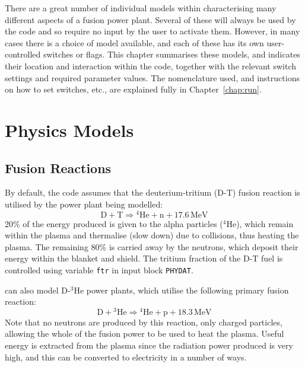 \label{chap:models}

There are a great number of individual models within \PSC characterising many
different aspects of a fusion power plant. Several of these will always be
used by the code and so require no input by the user to activate them.
However, in many cases there is a choice of model available, and each of these
has its own user-controlled switches or flags. This chapter summarises these
models, and indicates their location and interaction within the code, together
with the relevant switch settings and required parameter values. The
nomenclature used, and instructions on how to set switches, etc., are
explained fully in Chapter~\ref{chap:run}.

\section{Physics Models}

\setlength{\parskip}{0mm}
\subsection{Fusion Reactions}

By default, the code assumes that the deuterium-tritium (D-T) fusion reaction
is utilised by the power plant being modelled:
\begin{equation}
\mathrm{D + T} \Longrightarrow \mathrm{^{4}He + n + 17.6 \,MeV}
\label{eq:d-t}
\end{equation}
20\% of the energy produced is given to the alpha particles ($^4$He), which
remain within the plasma and thermalise (slow down) due to collisions, thus
heating the plasma. The remaining 80\% is carried away by the neutrons, which
deposit their energy within the blanket and shield. The tritium fraction of
the D-T fuel is controlled using variable \texttt{ftr} in input block
\texttt{PHYDAT}.

\setlength{\parskip}{5mm}
\PS can also model D-$^3$He power plants, which utilise the following primary
fusion reaction:
\begin{equation}
\mathrm{D + \mbox{$^3$He}} \Longrightarrow \mathrm{^{4}He + p + 18.3 \,MeV}
\label{eq:dhe3}
\end{equation}
Note that no neutrons are produced by this reaction, only charged particles,
allowing the whole of the fusion power to be used to heat the plasma. Useful
energy is extracted from the plasma since the radiation power produced is very
high, and this can be converted to electricity in a number of ways.

